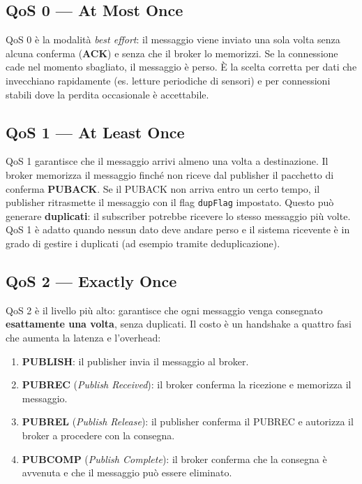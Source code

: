 \documentclass[
  italian,
  openany]{book}
\providecommand{\tightlist}{%
  \setlength{\itemsep}{0pt}\setlength{\parskip}{0pt}}
\begin{document}
\subsection{QoS 0 --- At Most Once}\label{qos-0-at-most-once}

QoS 0 è la modalità \emph{best effort}: il messaggio viene inviato una
sola volta senza alcuna conferma (\textbf{ACK}) e senza che il broker lo
memorizzi. Se la connessione cade nel momento sbagliato, il messaggio è
perso. È la scelta corretta per dati che invecchiano rapidamente (es.
letture periodiche di sensori) e per connessioni stabili dove la perdita
occasionale è accettabile.

\subsection{QoS 1 --- At Least Once}\label{qos-1-at-least-once}

QoS 1 garantisce che il messaggio arrivi almeno una volta a
destinazione. Il broker memorizza il messaggio finché non riceve dal
publisher il pacchetto di conferma \textbf{PUBACK}. Se il PUBACK non
arriva entro un certo tempo, il publisher ritrasmette il messaggio con
il flag \texttt{dupFlag} impostato. Questo può generare
\textbf{duplicati}: il subscriber potrebbe ricevere lo stesso messaggio
più volte. QoS 1 è adatto quando nessun dato deve andare perso e il
sistema ricevente è in grado di gestire i duplicati (ad esempio tramite
deduplicazione).

\subsection{QoS 2 --- Exactly Once}\label{qos-2-exactly-once}

QoS 2 è il livello più alto: garantisce che ogni messaggio venga
consegnato \textbf{esattamente una volta}, senza duplicati. Il costo è
un handshake a quattro fasi che aumenta la latenza e l'overhead:

\begin{enumerate}
\def\labelenumi{\arabic{enumi}.}
\tightlist
\item
  \textbf{PUBLISH}: il publisher invia il messaggio al broker.
\item
  \textbf{PUBREC} (\emph{Publish Received}): il broker conferma la
  ricezione e memorizza il messaggio.
\item
  \textbf{PUBREL} (\emph{Publish Release}): il publisher conferma il
  PUBREC e autorizza il broker a procedere con la consegna.
\item
  \textbf{PUBCOMP} (\emph{Publish Complete}): il broker conferma che la
  consegna è avvenuta e che il messaggio può essere eliminato.
\end{enumerate}
\end{document}
